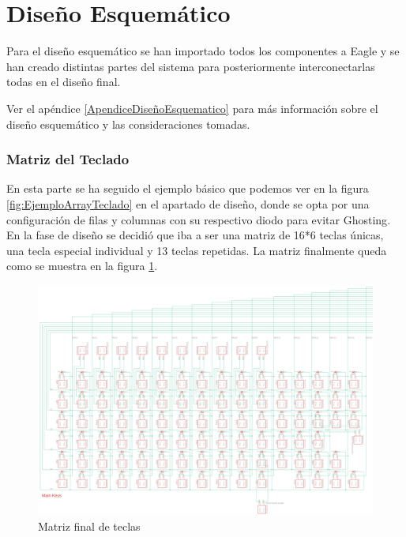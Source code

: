 \newpage
\section{Diseño Esquemático}
Para el diseño esquemático se han importado todos los componentes a Eagle y se han creado distintas partes del sistema para posteriormente interconectarlas todas en el diseño final.

\begin{tcolorbox}[colback=blue!5!white, colframe=blue!55!white, title=Nota]
    Ver el apéndice \ref{ApendiceDiseñoEsquematico} para más información sobre el diseño esquemático y las consideraciones tomadas. 
\end{tcolorbox}

\subsubsection{Matriz del Teclado}
En esta parte se ha seguido el ejemplo básico que podemos ver en la figura \ref{fig:EjemploArrayTeclado} en el apartado de diseño, donde se opta por una configuración de filas y columnas con su respectivo diodo para evitar \gls{Ghosting}. En la fase de diseño se decidió que iba a ser una matriz de 16*6 teclas únicas, una tecla especial individual y 13 teclas repetidas. La matriz finalmente queda como se muestra en la figura \ref{fig:MatrizTeclas}.

\begin{figure}[H]
    \centering
    \includegraphics[width=1.0\textwidth]{imagenes/Capitulos/Cap04/MatrizTeclas.png}
    \caption{Matriz final de teclas \cite{Repo:ImagenCircuito}}
    \label{fig:MatrizTeclas}
\end{figure}

